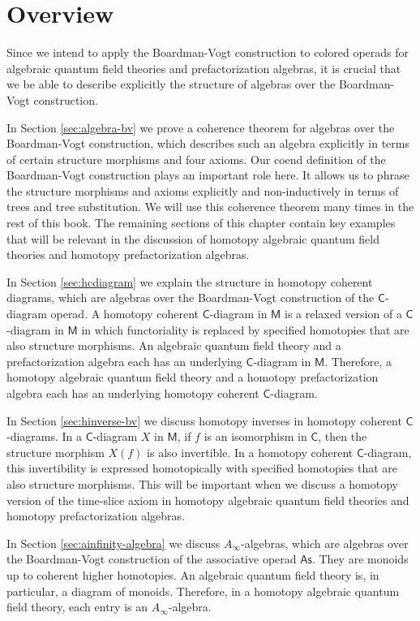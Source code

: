 \documentclass[11pt]{amsbook}
\numberwithin{section}{chapter}
\numberwithin{subsection}{section}
\numberwithin{equation}{section}
\theoremstyle{plain}
\theoremstyle{definition}
\newcommand{\C}{\mathsf{C}}
\newcommand{\M}{\mathsf{M}}
\newcommand{\As}{\mathsf{As}}
\begin{document}
\section{Overview}
Since we intend to apply the Boardman-Vogt construction to colored operads for algebraic quantum field theories and prefactorization algebras, it is crucial that we be able to describe explicitly the structure of algebras over the Boardman-Vogt construction.

In Section \ref{sec:algebra-bv} we prove a coherence theorem for algebras over the Boardman-Vogt construction, which describes such an algebra explicitly in terms of certain structure morphisms and four axioms.  Our coend definition of the Boardman-Vogt construction plays an important role here.  It allows us to phrase the structure morphisms and axioms explicitly and non-inductively in terms of trees and tree substitution.  We will use this coherence theorem many times in the rest of this book.  The remaining sections of this chapter contain key examples that will be relevant in the discussion of homotopy algebraic quantum field theories and homotopy prefactorization algebras.  

In Section \ref{sec:hcdiagram} we explain the structure in homotopy coherent diagrams, which are algebras over the Boardman-Vogt construction of the $\C$-diagram operad.  A homotopy coherent $\C$-diagram in $\M$ is a relaxed version of a $\C$-diagram in $\M$ in which functoriality is replaced by specified homotopies that are also structure morphisms.  An algebraic quantum field theory and a prefactorization algebra each has an underlying $\C$-diagram in $\M$.  Therefore, a homotopy algebraic quantum field theory and a homotopy prefactorization algebra each has an underlying homotopy coherent $\C$-diagram.  

In Section \ref{sec:hinverse-bv} we discuss homotopy inverses in homotopy coherent $\C$-diagrams.  In a $\C$-diagram $X$ in $\M$, if $f$ is an isomorphism in $\C$, then the structure morphism $X(f)$ is also invertible.  In a homotopy coherent $\C$-diagram, this invertibility is expressed homotopically with specified homotopies that are also structure morphisms.  This will be important when we discuss a homotopy version of the time-slice axiom in homotopy algebraic quantum field theories and homotopy prefactorization algebras.

In Section \ref{sec:ainfinity-algebra} we discuss $A_{\infty}$-algebras, which are algebras over the Boardman-Vogt construction of the associative operad $\As$.  They are monoids up to coherent higher homotopies.  An algebraic quantum field theory is, in particular, a diagram of monoids.  Therefore, in a homotopy algebraic quantum field theory, each entry is an $A_\infty$-algebra.
\end{document}
